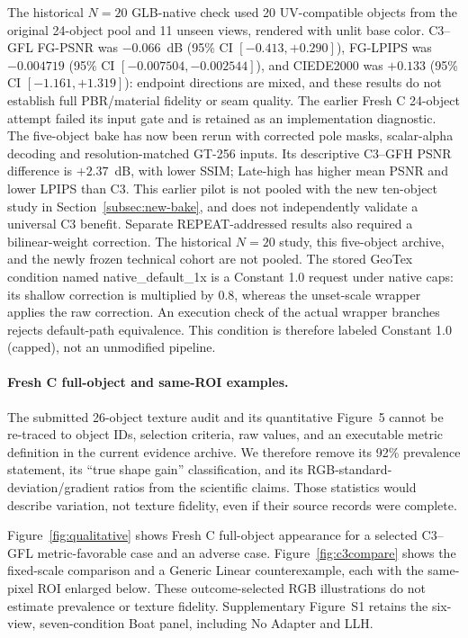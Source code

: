 \documentclass[times,twocolumn,final]{elsarticle}
\providecommand{\DIFadd}[1]{{\protect\color{blue} \sf #1}} %
\providecommand{\DIFaddend}{} %
\begin{document}
\DIFadd{The historical $N=20$ GLB-native check used 20 UV-compatible objects from the original 24-object pool and 11 unseen views, rendered with unlit base color. C3--GFL FG-PSNR was $-0.066$~dB (95\% CI $[-0.413,+0.290]$), FG-LPIPS was $-0.004719$ (95\% CI $[-0.007504,-0.002544]$), and CIEDE2000 was $+0.133$ (95\% CI $[-1.161,+1.319]$): endpoint directions are mixed, and these results do not establish full PBR/material fidelity or seam quality. The earlier Fresh C 24-object attempt failed its input gate and is retained as an implementation diagnostic. The five-object bake has now been rerun with corrected pole masks, scalar-alpha decoding and resolution-matched GT-256 inputs. Its descriptive C3--GFH PSNR difference is $+2.37$~dB, with lower SSIM; Late-high has higher mean PSNR and lower LPIPS than C3. This earlier pilot is not pooled with the new ten-object study in Section~\ref{subsec:new-bake}, and does not independently validate a universal C3 benefit. Separate REPEAT-addressed results also required a bilinear-weight correction. The historical $N=20$ study, this five-object archive, and the newly frozen technical cohort are not pooled. The stored GeoTex condition named native\_default\_1x is a Constant 1.0 request under native caps: its shallow correction is multiplied by 0.8, whereas the unset-scale wrapper applies the raw correction. An execution check of the actual wrapper branches rejects default-path equivalence. This condition is therefore labeled Constant 1.0 (capped), not an unmodified pipeline.
}

\paragraph{Fresh C full-object and same-ROI examples.}
\label{subsec:visual}

\DIFadd{The submitted 26-object texture audit and its quantitative Figure~5 cannot be re-traced to object IDs, selection criteria, raw values, and an executable metric definition in the current evidence archive. We therefore remove its 92\% prevalence statement, its “true shape gain” classification, and its RGB-standard-deviation/gradient ratios from the scientific claims. Those statistics would describe variation, not texture fidelity, even if their source records were complete.
}

\DIFadd{Figure~\ref{fig:qualitative} shows Fresh C full-object appearance for a selected C3--GFL metric-favorable case and an adverse case. Figure~\ref{fig:c3compare} shows the fixed-scale comparison and a Generic Linear counterexample, each with the same-pixel ROI enlarged below. These outcome-selected RGB illustrations do not estimate prevalence or texture fidelity. Supplementary Figure~S1 retains the six-view, seven-condition Boat panel, including No Adapter and LLH}\DIFaddend .
\end{document}
